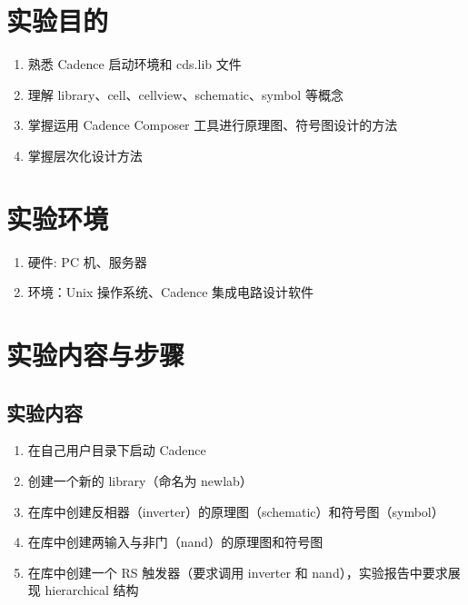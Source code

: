 \documentclass{theme-2614084}
\begin{document}

\makecover


\section{实验目的}

\begin{enumerate}
  \item 熟悉 Cadence 启动环境和 cds.lib 文件
  \item 理解 library、cell、cellview、schematic、symbol 等概念
  \item 掌握运用 Cadence Composer 工具进行原理图、符号图设计的方法
  \item 掌握层次化设计方法
\end{enumerate}

\section{实验环境}

\begin{enumerate}
  \item 硬件: PC 机、服务器
  \item 环境：Unix 操作系统、Cadence 集成电路设计软件
\end{enumerate}

\section{实验内容与步骤}


\subsection{实验内容}

\begin{enumerate}
  \item 在自己用户目录下启动 Cadence
  \item 创建一个新的 library（命名为 newlab）
  \item 在库中创建反相器（inverter）的原理图（schematic）和符号图（symbol）
  \item 在库中创建两输入与非门（nand）的原理图和符号图
  \item 在库中创建一个 RS 触发器（要求调用 inverter 和 nand），实验报告中要求展现 hierarchical 结构
\end{enumerate}
\end{document}
